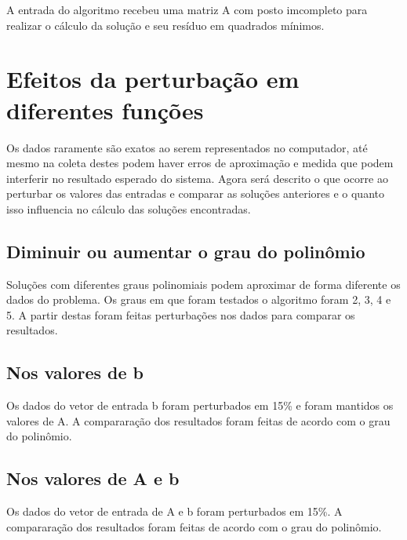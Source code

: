 A entrada do algoritmo recebeu uma matriz A com posto imcompleto para realizar
o cálculo da solução e seu resíduo em quadrados mínimos.


\chapter{Efeitos da perturbação em diferentes funções}
Os dados raramente são exatos ao serem representados no computador, até mesmo na 
coleta destes podem haver erros de aproximação e medida que podem interferir no
resultado esperado do sistema.
Agora será descrito o que ocorre ao perturbar os valores das entradas e 
comparar as soluções anteriores e o quanto isso influencia no cálculo das 
soluções encontradas.

\section{Diminuir ou aumentar o grau do polinômio}
Soluções com diferentes graus polinomiais podem aproximar de forma diferente
os dados do problema.
Os graus em que foram testados o algoritmo foram 2, 3, 4 e 5.
A partir destas foram feitas perturbações nos dados para comparar os resultados.

\section{Nos valores de b}
Os dados do vetor de entrada b foram perturbados em 15\% e foram mantidos os
valores de A.
A compararação dos resultados foram feitas de acordo com o grau do polinômio. 
\section{Nos valores de A e b}

Os dados do vetor de entrada de A e b foram perturbados em 15\%.
A compararação dos resultados foram feitas de acordo com o grau do polinômio.




